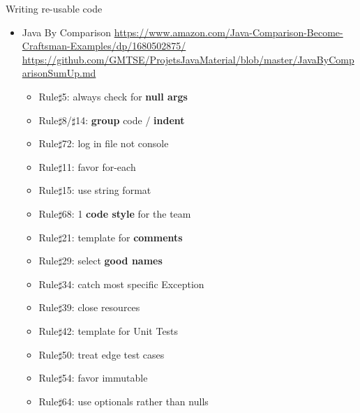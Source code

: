 \documentclass[English,t,%
hyperref={%
    pdftitle={FISA-DE2 OOP in Java},%
    pdfauthor={Guillaume Muller},%
    pdfsubject={OOP in Java},%
    pdfkeywords={OOP,Java}%
    },%
xcolor={pdftex,svgnames} %
]{beamer}
\begin{document}




\begin{frame}{Writing re-usable code}

  \begin{itemize}
    \item Java By Comparison
    { \tiny \url{https://www.amazon.com/Java-Comparison-Become-Craftsman-Examples/dp/1680502875/} } \\
    { \tiny \url{https://github.com/GMTSE/ProjetsJavaMaterial/blob/master/JavaByComparisonSumUp.md} }
{\small
      \begin{itemize}
        \item Rule$\sharp$5: always check for \textbf{null args}
        \item Rule$\sharp$8/$\sharp$14: \textbf{group} code / \textbf{indent}
        \item Rule$\sharp$72: log in file not console
        \item Rule$\sharp$11: favor for-each
        \item Rule$\sharp$15: use string format
        \item Rule$\sharp$68: 1 \textbf{code style} for the team
        \item Rule$\sharp$21: template for \textbf{comments}
        \item Rule$\sharp$29: select \textbf{good names}
        \item Rule$\sharp$34: catch most specific Exception
        \item Rule$\sharp$39: close resources
        \item Rule$\sharp$42: template for Unit Tests
        \item Rule$\sharp$50: treat edge test cases
        \item Rule$\sharp$54: favor immutable
        \item Rule$\sharp$64: use optionals rather than nulls
      \end{itemize}
}
  \end{itemize}

\end{frame}
\end{document}
